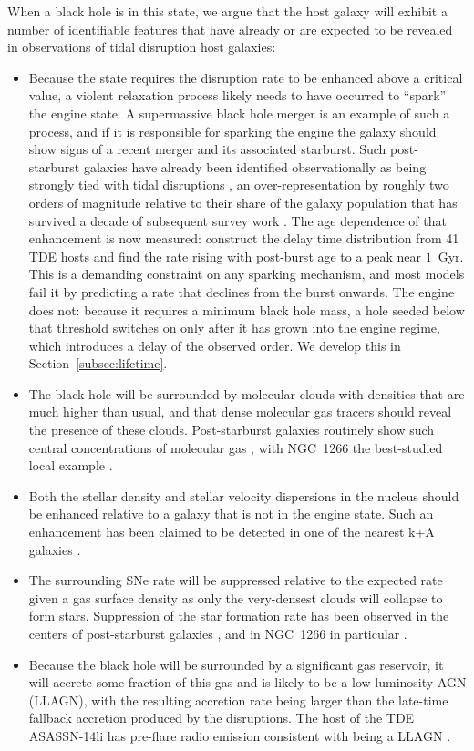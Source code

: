\documentclass[preprint2]{aastex}
\begin{document}
When a black hole is in this state, we argue that the host galaxy will exhibit a number of identifiable features that have already or are expected to be revealed in observations of tidal disruption host galaxies:
\begin{itemize}
\item Because the state requires the disruption rate to be enhanced above a critical value, a violent relaxation process likely needs to have occurred to ``spark'' the engine state. A supermassive black hole merger is an example of such a process, and if it is responsible for sparking the engine the galaxy should show signs of a recent merger and its associated starburst. Such post-starburst galaxies have already been identified observationally as being strongly tied with tidal disruptions \citep{Arcavi:2014a,French:2016a}, an over-representation by roughly two orders of magnitude relative to their share of the galaxy population that has survived a decade of subsequent survey work \citep{French:2020a,Gezari:2021a,Hammerstein:2023a}. The age dependence of that enhancement is now measured: \citet{Shepherd:2026a} construct the delay time distribution from 41 TDE hosts and find the rate rising with post-burst age to a peak near $1$~Gyr. This is a demanding constraint on any sparking mechanism, and most models fail it by predicting a rate that declines from the burst onwards. The engine does not: because it requires a minimum black hole mass, a hole seeded below that threshold switches on only after it has grown into the engine regime, which introduces a delay of the observed order. We develop this in Section~\ref{subsec:lifetime}.
\item The black hole will be surrounded by molecular clouds with densities that are much higher than usual, and that dense molecular gas tracers should reveal the presence of these clouds. Post-starburst galaxies routinely show such central concentrations of molecular gas \citep{French:2015a,Smercina:2018a}, with NGC~1266 the best-studied local example \citep{Alatalo:2011a,Alatalo:2014a}.
\item Both the stellar density and stellar velocity dispersions in the nucleus should be enhanced relative to a galaxy that is not in the engine state. Such an enhancement has been claimed to be detected in one of the nearest k+A galaxies \citep{Stone:2016b}.
\item The surrounding SNe rate will be suppressed relative to the expected rate given a gas surface density as only the very-densest clouds will collapse to form stars. Suppression of the star formation rate has been observed in the centers of post-starburst galaxies \citep{French:2018a}, and in NGC~1266 in particular \citep{Alatalo:2015a}.
\item Because the black hole will be surrounded by a significant gas reservoir, it will accrete some fraction of this gas and is likely to be a low-luminosity AGN (LLAGN), with the resulting accretion rate being larger than the late-time fallback accretion produced by the disruptions. The host of the TDE ASASSN-14li has pre-flare radio emission consistent with being a LLAGN \citep{Alexander:2016a,Alexander:2020a}.
\end{itemize}
\end{document}

